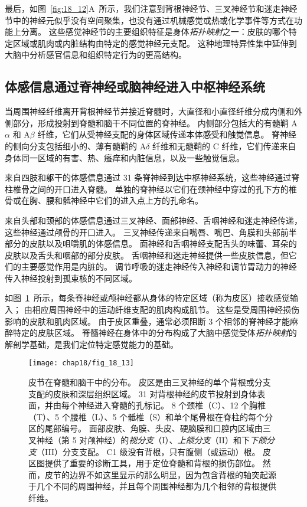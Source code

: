 最后，如图~\ref{fig:18_12}A~所示，我们注意到背根神经节、三叉神经节和迷走神经节中的神经元似乎没有空间聚集，也没有通过机械感觉或热或化学事件等方式在功能上分离。
这些感觉神经节的主要组织特征是身体\textit{拓扑映射}之一：皮肤的哪个特定区域或肌肉或内脏结构由特定的感觉神经元支配。
这种地理特异性集中延伸到大脑中分析感官信息和组织特定行为的更高结构。



\subsection{体感信息通过脊神经或脑神经进入中枢神经系统}

当周围神经纤维离开背根神经节并接近脊髓时，大直径和小直径纤维分成内侧和外侧部分，形成投射到脊髓和脑干不同位置的脊神经。
内侧部分包括大的有髓鞘 A$\alpha$ 和 A$\beta$ 纤维，它们从受神经支配的身体区域传递本体感受和触觉信息。
脊神经的侧向分支包括细小的、薄有髓鞘的 A$\delta$ 纤维和无髓鞘的 C 纤维，它们传递来自身体同一区域的有害、热、瘙痒和内脏信息，以及一些触觉信息。


来自四肢和躯干的体感信息通过 31 条脊神经到达中枢神经系统，这些神经通过脊柱椎骨之间的开口进入脊髓。 
单独的脊神经以它们在颈神经中穿过的孔下方的椎骨或在胸、腰和骶神经中它们的进入点上方的孔命名。


来自头部和颈部的体感信息通过三叉神经、面部神经、舌咽神经和迷走神经传递，这些神经通过颅骨的开口进入。 
三叉神经传递来自嘴唇、嘴巴、角膜和头部前半部分的皮肤以及咀嚼肌的体感信息。
面神经和舌咽神经支配舌头的味蕾、耳朵的皮肤以及舌头和咽部的部分皮肤。
舌咽神经和迷走神经提供一些皮肤信息，但它们的主要感觉作用是内脏的。
调节呼吸的迷走神经传入神经和调节胃动力的神经传入神经投射到孤束核的不同区域。


如图~\ref{fig:18_13}~所示，每条脊神经或颅神经都从身体的特定区域（称为皮区）接收感觉输入；
由相应周围神经中的运动纤维支配的肌肉构成肌节。
这些是受周围神经损伤影响的皮肤和肌肉区域。
由于皮区重叠，通常必须阻断 3 个相邻的脊神经才能麻醉特定的皮肤区域。
脊髓神经在身体中的分布构成了大脑中感觉受体\textit{拓扑映射}的解剖学基础，是我们定位特定感觉能力的基础。


\begin{figure}[htbp]
	\centering
	\texttt{[image: chap18/fig\_18\_13]}
	\caption{皮节在脊髓和脑干中的分布。 
		皮区是由三叉神经的单个背根或分支支配的皮肤和深层组织区域。 
		31 对背根神经的皮节投射到身体表面，并由每个神经进入脊髓的孔标记。 
		8 个颈椎（C）、12 个胸椎（T）、5 个腰椎（L）、5 个骶椎（S）和单个尾骨根在脊柱的每个分区的尾部编号。 
		面部皮肤、角膜、头皮、硬脑膜和口腔内区域由三叉神经（第 5 对颅神经）的\textit{视分支}（I）、\textit{上颌分支}（II）和下\textit{下颌分支}（III）分支支配。
		C1 级没有背根，只有腹侧（或运动）根。 
		皮区图提供了重要的诊断工具，用于定位脊髓和背根的损伤部位。 
		然而，皮节的边界不如这里显示的那么明显，因为包含背根的轴突起源于几个不同的周围神经，并且每个周围神经都为几个相邻的背根提供纤维。}
	\label{fig:18_13}
\end{figure}


